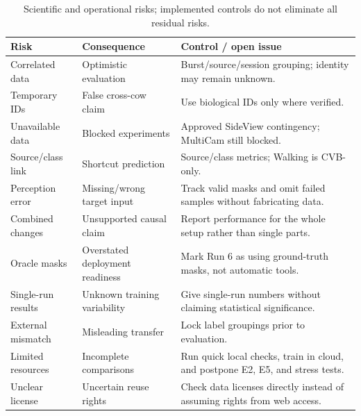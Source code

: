 \begin{table}[htbp]
\centering\small
\caption[Research risks and mitigations]{Scientific and operational risks; implemented controls do not eliminate all residual risks.}\label{tab:risks}
\begin{tabularx}{\textwidth}{lYY}
\toprule
Risk & Consequence & Control / open issue \\
\midrule
Correlated data & Optimistic evaluation & Burst/source/session grouping; identity may remain unknown. \\
Temporary IDs & False cross-cow claim & Use biological IDs only where verified. \\
Unavailable data & Blocked experiments & Approved SideView contingency; MultiCam still blocked. \\
Source/class link & Shortcut prediction & Source/class metrics; Walking is CVB-only. \\
Perception error & Missing/wrong target input & Track valid masks and omit failed samples without fabricating data. \\
Combined changes & Unsupported causal claim & Report performance for the whole setup rather than single parts. \\
Oracle masks & Overstated deployment readiness & Mark Run 6 as using ground-truth masks, not automatic tools. \\
Single-run results & Unknown training variability & Give single-run numbers without claiming statistical significance. \\
External mismatch & Misleading transfer & Lock label groupings prior to evaluation. \\
Limited resources & Incomplete comparisons & Run quick local checks, train in cloud, and postpone E2, E5, and stress tests. \\
Unclear license & Uncertain reuse rights & Check data licenses directly instead of assuming rights from web access. \\
\bottomrule
\end{tabularx}
\end{table}
